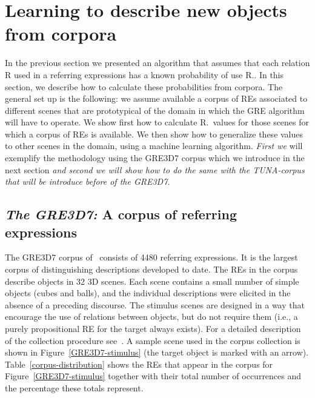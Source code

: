 \section{Learning to describe new objects from corpora}
\label{sec:learning}

In the previous section we presented an algorithm that assumes that each relation R 
used in a referring expressions has a known probability of use R.\puse. In this section, 
we describe how to calculate these probabilities from corpora.  
The general set up is the following: we assume available a corpus of REs associated 
to different scenes that are prototypical of the domain in which the GRE algorithm will have to operate.   
We show first how to calculate R.\puse\ values for those scenes for which a corpus of REs is available.  
We then show how to generalize these values to 
other scenes in the domain, using a machine learning algorithm. \textit{First we} will exemplify the methodology using 
the GRE3D7 corpus which we introduce in the next section \textit{and second we will show how to do the same with the TUNA-corpus 
that will be introduce before of the GRE3D7.}

\subsection{\textit{The GRE3D7:} A corpus of referring expressions}

The GRE3D7 corpus of~ consists of 4480 referring expressions. 
It is the largest corpus of distinguishing descriptions developed to date. 
The REs in the corpus describe objects in 32 3D scenes. Each scene contains a small number of simple objects 
(cubes and balls), and the individual descriptions were elicited in the absence of a preceding discourse. 
The stimulus scenes are designed in a way that encourage the use of relations between objects, but do not require them 
(i.e., a purely propositional RE for the target always exists). For a detailed description of the collection procedure 
see~\cite[Chapter 5]{viet:gene11}. A sample scene used in the corpus collection is shown in Figure~\ref{GRE3D7-stimulus} 
(the target object is marked with an arrow). Table~\ref{corpus-distribution} shows the REs that appear in the corpus for 
Figure~\ref{GRE3D7-stimulus} together with their total number of occurrences and the percentage these totals represent.  

